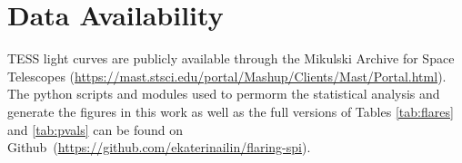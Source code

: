 \documentclass[fleqn,usenatbib]{mnras}%
\begin{document}
\section*{Data Availability}
TESS light curves are publicly available through the Mikulski Archive for Space Telescopes (\url{https://mast.stsci.edu/portal/Mashup/Clients/Mast/Portal.html}). The python scripts and modules used to permorm the statistical analysis and generate the figures in this work as well as the full versions of Tables \ref{tab:flares} and \ref{tab:pvals} can be found on Github~(\url{https://github.com/ekaterinailin/flaring-spi}).











%
%




\bsp	%
\label{lastpage}
\end{document}
